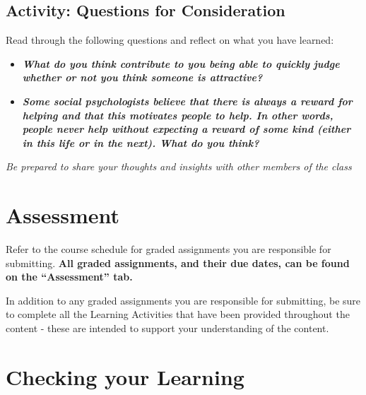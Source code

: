 \documentclass[
]{book}
\providecommand{\tightlist}{%
  \setlength{\itemsep}{0pt}\setlength{\parskip}{0pt}}
\begin{document}
\hypertarget{activity-questions-for-consideration-11}{%
\subsection*{Activity: Questions for Consideration}\label{activity-questions-for-consideration-11}}

\begin{reflect}
Read through the following questions and reflect on what you have learned:

\begin{itemize}
\tightlist
\item
  \textbf{\emph{What do you think contribute to you being able to quickly judge whether or not you think someone is attractive?}}\\
\item
  \textbf{\emph{Some social psychologists believe that there is always a reward for helping and that this motivates people to help. In other words, people never help without expecting a reward of some kind (either in this life or in the next). What do you think?}}
\end{itemize}

\emph{Be prepared to share your thoughts and insights with other members of the class}
\end{reflect}

\hypertarget{assessment-6}{%
\section*{Assessment}\label{assessment-6}}

\begin{assessment}
Refer to the course schedule for graded assignments you are responsible for submitting. \textbf{All graded assignments, and their due dates, can be found on the ``Assessment'' tab.}

In addition to any graded assignments you are responsible for submitting, be sure to complete all the Learning Activities that have been provided throughout the content - these are intended to support your understanding of the content.
\end{assessment}

\hypertarget{checking-your-learning-6}{%
\section*{Checking your Learning}\label{checking-your-learning-6}}
\end{document}
